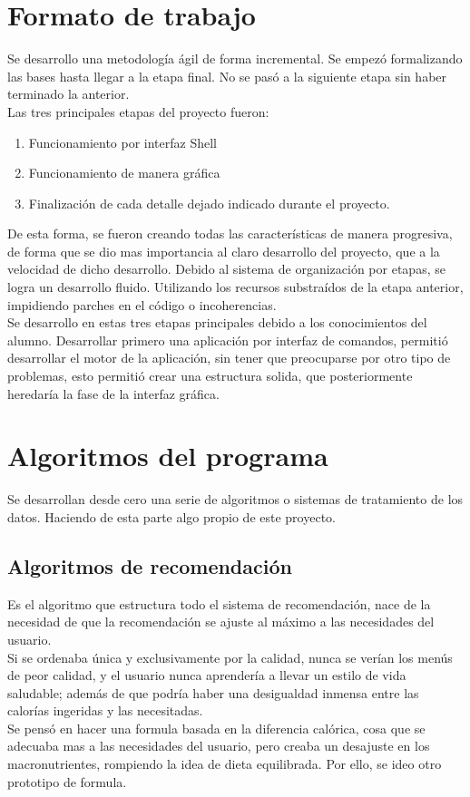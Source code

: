 \section{Formato de trabajo}
Se desarrollo una metodología ágil de forma incremental. Se empezó formalizando las bases hasta llegar a la etapa final. No se pasó a la siguiente etapa sin haber terminado la anterior.\\

Las tres principales etapas del proyecto fueron:
\begin{enumerate}
\item	Funcionamiento por interfaz Shell
\item	Funcionamiento de manera gráfica
\item	Finalización de cada detalle dejado indicado durante el proyecto.
\end{enumerate}

De esta forma, se fueron creando todas las características de manera progresiva, de forma que se dio mas importancia al claro desarrollo del proyecto, que a la velocidad de dicho desarrollo. Debido al sistema de organización por etapas, se logra un desarrollo fluido. Utilizando los recursos substraídos de la etapa anterior, impidiendo parches en el código o incoherencias.\\

Se desarrollo en estas tres etapas principales debido a los conocimientos del alumno. Desarrollar primero una aplicación por interfaz de comandos, permitió desarrollar el motor de la aplicación, sin tener que preocuparse por otro tipo de problemas, esto permitió crear una estructura solida, que posteriormente heredaría la fase de la interfaz gráfica.\\

\section{Algoritmos del programa}
Se desarrollan desde cero una serie de algoritmos o sistemas de tratamiento de los datos. Haciendo de esta parte algo propio de este proyecto.
\subsection{Algoritmos de recomendación}
Es el algoritmo que estructura todo el sistema de recomendación, nace de la necesidad de que la recomendación se ajuste al máximo a las necesidades del usuario.\\
Si se ordenaba única y exclusivamente por la calidad, nunca se verían los menús de peor calidad, y el usuario nunca aprendería a llevar un estilo de vida saludable; además de que podría haber una desigualdad inmensa entre las calorías ingeridas y las necesitadas.\\
Se pensó en hacer una formula basada en la diferencia calórica, cosa que se adecuaba mas a las necesidades del usuario, pero creaba un desajuste en los macronutrientes, rompiendo la idea de dieta equilibrada. Por ello, se ideo otro prototipo de formula.\\

